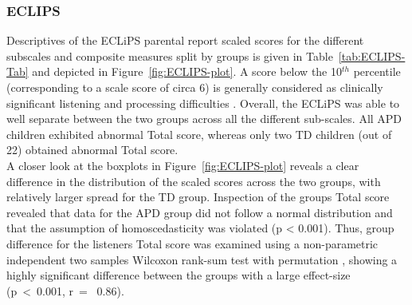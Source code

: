 \documentclass[a4paper, twoside]{templates/ociamthesis}
\begin{document}
\hypertarget{eclips}{%
\subsubsection{ECLIPS}\label{eclips}}

Descriptives of the ECLiPS parental report scaled scores for the different subscales and composite measures split by groups is given in Table~\ref{tab:ECLIPS-Tab} and depicted in Figure~\ref{fig:ECLIPS-plot}. A score below the 10\(^{th}\) percentile (corresponding to a scale score of circa 6) is generally considered as clinically significant listening and processing difficulties \autocite{Barry2014}. Overall, the ECLiPS was able to well separate between the two groups across all the different sub-scales. All APD children exhibited abnormal Total score, whereas only two TD children (out of 22) obtained abnormal Total score.\\

A closer look at the boxplots in Figure~\ref{fig:ECLIPS-plot} reveals a clear difference in the distribution of the scaled scores across the two groups, with relatively larger spread for the TD group. Inspection of the groups Total score revealed that data for the APD group did not follow a normal distribution and that the assumption of homoscedasticity was violated (p \textless{} 0.001). Thus, group difference for the listeners Total score was examined using a non-parametric independent two samples Wilcoxon rank-sum test with permutation \autocite[N=999999, \emph{coin::wilcox\_test()};][]{CoinPackageR}, showing a highly significant difference between the groups with a large effect-size (p~\textless~0.001, r~= ~0.86).\\
\end{document}
